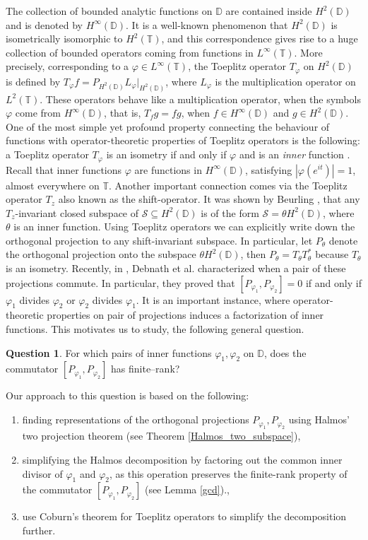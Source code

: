\documentclass[12pt, a4 paper]{amsart}
\newcommand{\cls}{\mathcal{S}}
\newcommand{\D}{\mathbb{D}}
\newcommand{\T}{\mathbb{T}}
\theoremstyle{definition}
\newtheorem*{quesn*}{Question}
\theoremstyle{plain}
\theoremstyle{definition}
\numberwithin{equation}{section}
\let\phi=\varphi
\begin{document}
The collection of bounded analytic functions on $\D$ are contained inside $H^2(\D)$ and is denoted by $H^{\infty}(\D)$. It is a well-known phenomenon that $H^2(\D)$ is isometrically isomorphic to $H^2(\mathbb{T})$, and this correspondence gives rise to a huge collection of bounded operators coming from functions in $L^{\infty}(\T)$. More precisely, corresponding to a $\phi \in L^{\infty}(\T)$, the Toeplitz operator $T_{\phi}$ on $H^2(\D)$ is defined by $T_{\phi} f = P_{H^2(\D)} L_{\phi}|_{H^2(\D)}$, where $L_{\phi}$ is the multiplication operator on $L^2(\mathbb{T})$. These operators behave like a multiplication operator, when the symbols $\phi$ come from $H^{\infty}(\D)$, that is, $T_f g= fg$, when $f \in H^{\infty}(\D)$ and $g \in H^2(\D)$. One of the most simple yet profound property connecting the behaviour of functions with operator-theoretic properties of Toeplitz operators is the following: a Toeplitz operator $T_{\phi}$ is an isometry if and only if $\phi$ and is an \textit{inner} function \cite{BH}. Recall that inner functions $\phi$ are functions in $H^{\infty}(\D)$, satisfying $|\phi(e^{it})|=1$, almost everywhere on $\mathbb{T}$. Another important connection comes via the Toeplitz operator $T_z$ also known as the shift-operator. It was shown by Beurling \cite{Beurling}, that any $T_z$-invariant closed subspace of $\cls \subseteq H^2(\D)$ is of the form $\cls = \theta H^2(\D)$, where $\theta$ is an inner function. Using Toeplitz operators we can explicitly write down the orthogonal projection to any shift-invariant subspace. In particular, let $P_{\theta}$ denote the orthogonal projection onto the subspace $\theta H^2(\D)$, then $P_{\theta} = T_{\theta} T_{\theta}^*$ because $T_{\theta}$ is an isometry. Recently, in \cite[Theorem 2.2]{DPS}, Debnath et al. characterized when a pair of these projections commute. In particular, they proved that $[P_{\phi_1}, P_{\phi_2}]=0$ if and only if $\phi_1$ divides $\phi_2$ or $\phi_2$ divides $\phi_1$. It is an important instance, where operator-theoretic properties on pair of projections induces a factorization of inner functions. This motivates us to study, the following general question.

\begin{quesn*}
For which pairs of inner functions $\phi_1,\phi_2$ on $\D$, does the commutator $[P_{\phi_1},P_{\phi_2}]$ has finite--rank?
\end{quesn*}

Our approach to this question is based on the following: \begin{enumerate}
\item[(i)] finding representations of the orthogonal projections $P_{\phi_1}, P_{\phi_2}$ using Halmos' two projection theorem (see Theorem \ref{Halmos_two_subspace}),
\item[(ii)] simplifying the Halmos decomposition by factoring out the common inner divisor of $\phi_1$ and $\phi_2$, as this operation preserves the finite-rank property of the commutator $[P_{\phi_1}, P_{\phi_2}]$ (see Lemma \ref{gcd}).,
\item[(ii)] use Coburn's theorem for Toeplitz operators to simplify the decomposition further.
\end{enumerate}
\end{document}
